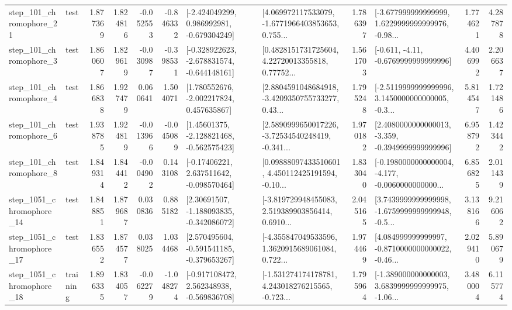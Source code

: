 \begin{tabular}{llrrrrllrlrr}
  step\_101\_chromophore\_21 &      test &      1.877369 &    1.824816 &     -0.052553 & -0.846332 &   [-2.424049299, 0.986992981, -0.679304249] &  [4.069972117533079, -1.6771966403853653, 0.755... &       1.786397 &  [-3.677999999999999, 1.6229999999999976, -0.98... &            1.774621 &          4.287878 \\
   step\_101\_chromophore\_3 &      test &      1.860607 &    1.829619 &     -0.030987 & -0.398531 &  [-0.328922623, -2.678831574, -0.644148161] &  [0.4828151731725604, 4.22720013355818, 0.77752... &       1.561703 &               [-0.611, -4.11, -0.6769999999999996] &            4.406992 &          2.206637 \\
   step\_101\_chromophore\_4 &      test &      1.866838 &    1.927479 &      0.060641 &  1.504071 &    [1.780552676, -2.002217824, 0.457635867] &  [2.8804591048684918, -3.4209350755733277, 0.43... &       1.795248 &  [-2.5119999999999996, 3.1450000000000005, -0.3... &            5.814547 &          1.721486 \\
   step\_101\_chromophore\_6 &      test &      1.938785 &    1.924819 &     -0.013966 & -0.045089 &    [1.45601375, -2.128821468, -0.562575423] &  [2.5890999650017226, -3.72534540248419, -0.341... &       1.970182 &  [2.4080000000000013, -3.359, -0.3949999999999996] &            6.958792 &          1.423442 \\
   step\_101\_chromophore\_8 &      test &      1.849314 &    1.844412 &     -0.004902 &  0.143108 &    [-0.17406221, 2.637511642, -0.098570464] &  [0.09888097433510601, 4.450112425191594, -0.10... &       1.833040 &  [-0.1980000000000004, -4.177, -0.0060000000000... &            6.856825 &          2.011439 \\
 step\_1051\_chromophore\_14 &      test &      1.848851 &    1.879687 &      0.030836 &  0.885182 &    [2.30691507, -1.188093835, -0.342086072] &  [-3.819729948455083, 2.519389903856414, 0.6910... &       2.045165 &  [3.7439999999999998, -1.6759999999999948, -0.5... &            3.138166 &          9.216062 \\
 step\_1051\_chromophore\_17 &      test &      1.836552 &    1.874577 &      0.038025 &  1.034468 &   [2.570495604, -0.591541185, -0.379653267] &  [-4.355847049533596, 1.3620915689061084, 0.722... &       1.974469 &  [4.084999999999997, -0.8710000000000022, -0.46... &            2.029410 &          5.890679 \\
 step\_1051\_chromophore\_18 &  training &      1.896335 &    1.834057 &     -0.062279 & -1.048274 &   [-0.917108472, 2.562348938, -0.569836708] &  [-1.531274174178781, 4.243018276215565, -0.723... &       1.795964 &  [-1.389000000000003, 3.6839999999999975, -1.06... &            3.480004 &          6.115774 \\

\end{tabular}
